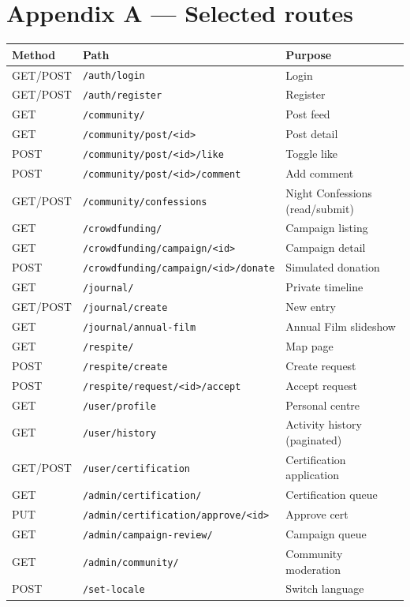 \section*{Appendix A — Selected routes}
{\small
\begin{tabularx}{\linewidth}{@{} L{1.6cm} L{5.5cm} X @{}}
  \toprule
  \textbf{Method} & \textbf{Path} & \textbf{Purpose} \\
  \midrule
  GET/POST & \texttt{/auth/login} & Login \\
  GET/POST & \texttt{/auth/register} & Register \\
  GET      & \texttt{/community/} & Post feed \\
  GET      & \texttt{/community/post/<id>} & Post detail \\
  POST     & \texttt{/community/post/<id>/like} & Toggle like \\
  POST     & \texttt{/community/post/<id>/comment} & Add comment \\
  GET/POST & \texttt{/community/confessions} & Night Confessions
            (read/submit) \\
  GET      & \texttt{/crowdfunding/} & Campaign listing \\
  GET      & \texttt{/crowdfunding/campaign/<id>} & Campaign detail \\
  POST     & \texttt{/crowdfunding/campaign/<id>/donate} & Simulated
            donation \\
  GET      & \texttt{/journal/} & Private timeline \\
  GET/POST & \texttt{/journal/create} & New entry \\
  GET      & \texttt{/journal/annual-film} & Annual Film slideshow \\
  GET      & \texttt{/respite/} & Map page \\
  POST     & \texttt{/respite/create} & Create request \\
  POST     & \texttt{/respite/request/<id>/accept} & Accept request \\
  GET      & \texttt{/user/profile} & Personal centre \\
  GET      & \texttt{/user/history} & Activity history (paginated) \\
  GET/POST & \texttt{/user/certification} & Certification application \\
  GET      & \texttt{/admin/certification/} & Certification queue \\
  PUT      & \texttt{/admin/certification/approve/<id>} & Approve cert \\
  GET      & \texttt{/admin/campaign-review/} & Campaign queue \\
  GET      & \texttt{/admin/community/} & Community moderation \\
  POST     & \texttt{/set-locale} & Switch language \\
  \bottomrule
\end{tabularx}}

